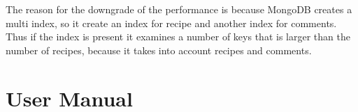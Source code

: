 \documentclass[a4paper]{report}
\begin{document}
\noindent The reason for the downgrade of the performance is because MongoDB creates a multi index, so it create an index for recipe and another index for comments. Thus if the index is present it examines a number of keys that is larger than the number of recipes, because it takes into account recipes and comments.

\chapter{User Manual}
\end{document}
